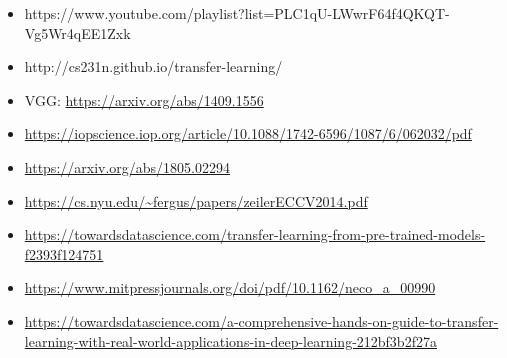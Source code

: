 \begin{itemize}
	\item https://www.youtube.com/playlist?list=PLC1qU-LWwrF64f4QKQT-Vg5Wr4qEE1Zxk
	\item http://cs231n.github.io/transfer-learning/
	\item VGG: \url{https://arxiv.org/abs/1409.1556}
	\item \url{https://iopscience.iop.org/article/10.1088/1742-6596/1087/6/062032/pdf}
	\item \url{https://arxiv.org/abs/1805.02294}
	\item \url{https://cs.nyu.edu/~fergus/papers/zeilerECCV2014.pdf}
	\item \url{https://towardsdatascience.com/transfer-learning-from-pre-trained-models-f2393f124751}
	\item \url{https://www.mitpressjournals.org/doi/pdf/10.1162/neco_a_00990}
	\item \url{https://towardsdatascience.com/a-comprehensive-hands-on-guide-to-transfer-learning-with-real-world-applications-in-deep-learning-212bf3b2f27a}
\end{itemize}
